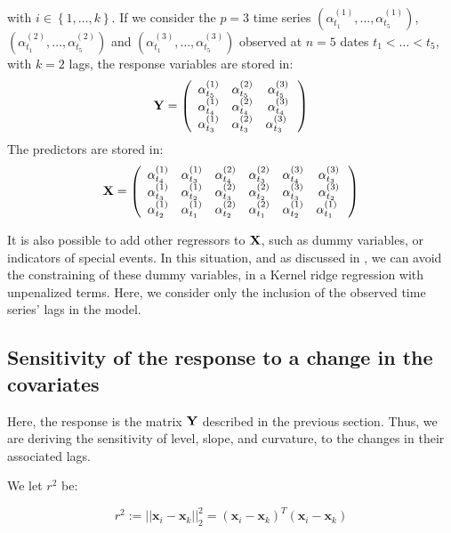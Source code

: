 with $i \in
\left\lbrace 1, \ldots, k \right\rbrace$. If we consider the $p = 3$ time series $(\alpha^{(1)}_{t_1}, \ldots,  \alpha^{(1)}_{t_5})$, $(\alpha^{(2)}_{t_1}, \ldots,  \alpha^{(2)}_{t_5})$ and $(\alpha^{(3)}_{t_1}, \ldots,  \alpha^{(3)}_{t_5})$ observed at $n = 5$ dates $t_1 < \ldots < t_5$, with $k = 2$ lags,  the response variables are stored in:
$$
{\bf Y} = \left( {\begin{array}{ccc} \alpha^{(1)}_{t_5} &  \alpha^{(2)}_{t_5} &  \alpha^{(3)}_{t_5}\\ \alpha^{(1)}_{t_4} & \alpha^{(2)}_{t_4} & \alpha^{(3)}_{t_4} \\ \alpha^{(1)}_{t_3} & \alpha^{(2)}_{t_3} & \alpha^{(3)}_{t_3}\      \end{array} } \right)
$$
The predictors are stored in:
$$
{\bf X} = \left( {\begin{array}{cccccc} \alpha^{(1)}_{t_4} & \alpha^{(1)}_{t_3} & \alpha^{(2)}_{t_4} & \alpha^{(2)}_{t_3} & \alpha^{(3)}_{t_4} & \alpha^{(3)}_{t_3} \\ \alpha^{(1)}_{t_3} & \alpha^{(1)}_{t_2} & \alpha^{(2)}_{t_3} & \alpha^{(2)}_{t_2} & \alpha^{(3)}_{t_3} & \alpha^{(3)}_{t_2} \\ \alpha^{(1)}_{t_2} & \alpha^{(1)}_{t_1} & \alpha^{(2)}_{t_2} & \alpha^{(2)}_{t_1} & \alpha^{(1)}_{t_2} & \alpha^{(1)}_{t_1} \      \end{array} }\right)
$$


It is also possible to add other regressors to ${\bf X}$, such as dummy variables, or indicators of special events. In this situation, and as discussed in \cite{exterkate2016nonlinear}, we can avoid the constraining of these dummy variables, in a Kernel ridge regression with unpenalized terms. Here, we consider only the inclusion of the observed time series' lags in the model.

\subsection{Sensitivity of the response to a change in the covariates}
\label{sec:sensitivity1}

Here, the response is the matrix ${\bf Y}$ described in the previous section. Thus, we are deriving the sensitivity of level, slope, and curvature, to the changes in their associated lags. 

\medskip

We let $r^2$ be:

$$
r^2 := || \textbf{x}_i - \textbf{x}_k ||^2_2 = (\textbf{x}_i - \textbf{x}_k)^T(\textbf{x}_i - \textbf{x}_k)
$$


